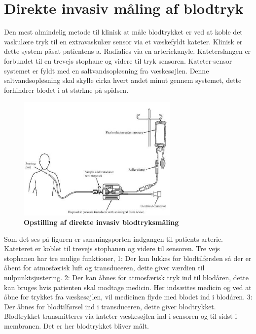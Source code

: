 \section{Direkte invasiv måling af blodtryk}
Den mest almindelig metode til klinisk at måle blodtrykket er ved at koble det vaskulære tryk til en extravaskulær sensor via et væskefyldt kateter. Klinisk er dette system påsat patientens a. Radialies via en arteriekanyle. Kateterslangen er forbundet til en trevejs stophane og videre til tryk sensoren. Kateter-sensor systemet er fyldt med en saltvandsopløsning fra væskesøjlen. Denne saltvandsopløsning skal skylle cirka hvert andet minut gennem systemet, dette forhindrer blodet i at størkne på spidsen.
\begin{figure}[H]
\includegraphics[width =0.7\textwidth , center]{billeder/kateter}
\caption{\textbf{Opstilling af direkte invasiv blodtryksmåling}}
\end{figure}
Som det ses på figuren er sansningsporten indgangen til patients arterie. Kateteret er koblet til trevejs stophanen og videre til sensoren. Tre vejs stophanen har tre mulige funktioner, 1: Der kan lukkes for blodtilførslen så der er åbent for atmosfærisk luft og transduceren, dette giver værdien til nulpunktsjustering. 2: Der kan åbnes for atmosfærisk tryk ind til blodåren, dette kan bruges hvis patienten skal modtage medicin. Her indsættes medicin og ved at åbne for trykket fra væskesøjlen, vil medicinen flyde med blodet ind i blodåren. 3: Der åbnes for blodtilførsel ind i transduceren, dette giver blodtrykket. Blodtrykket transmitteres via kateter væskesøjlen ind i sensoren og til sidst i membranen. Det er her blodtrykket bliver målt. 
